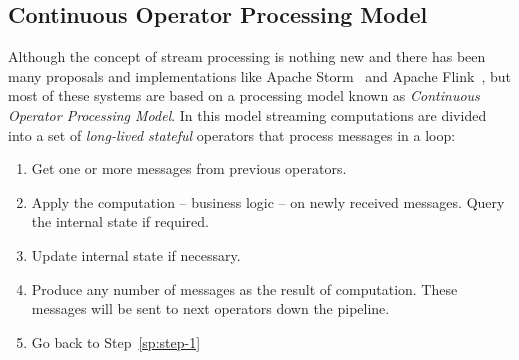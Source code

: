 \subsection{Continuous Operator Processing Model}
\label{sp:continues-model}

Although the concept of stream processing is nothing new and there has been many proposals and implementations like Apache Storm~\cite{Storm} and Apache Flink~\cite{flink}, but most of these systems are based on a processing model known as \emph{Continuous Operator Processing Model}. In this model streaming computations are divided into a set of \emph{long-lived stateful} operators that process messages in a loop:
\begin{enumerate}
    \item \label{sp:step-1}Get one or more messages from previous operators.
    \item Apply the computation -- business logic -- on newly received messages. Query the internal state if required.
    \item Update internal state if necessary.
    \item Produce any number of messages as the result of computation. These messages will be sent to next operators down the pipeline.
    \item Go back to Step~\ref{sp:step-1}
\end{enumerate}

